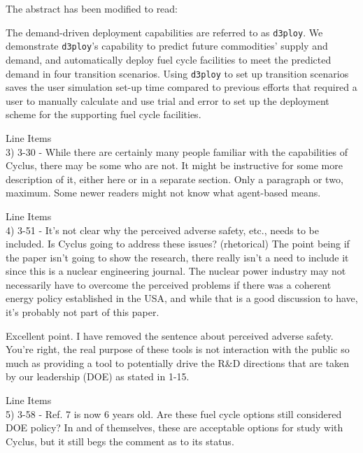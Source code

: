 \documentclass[answers,11pt]{exam}
\newcommand{\deploy}{\texttt{d3ploy}\xspace}%
\begin{document}
\begin{questions}
\begin{solution}
The abstract has been modified to read: 

The demand-driven deployment capabilities are referred to as \deploy. 
We demonstrate \deploy's capability to predict future commodities' 
supply and demand, and automatically deploy fuel 
cycle facilities to meet the predicted demand in four transition scenarios. 
Using \deploy to set up transition scenarios saves the user 
simulation set-up time compared to previous efforts that
required a user to manually calculate and use trial and error 
to set up the deployment scheme for the supporting fuel cycle 
facilities. 
\end{solution}

\question Line Items \\
3) 3-30 - While there are certainly many people familiar with the capabilities of Cyclus, there may be
some who are not. It might be instructive for some more description of it, either here or in a separate
section. Only a paragraph or two, maximum. Some newer readers might not know what agent-based
means.

\begin{solution}
\end{solution}

\question Line Items \\
4) 3-51 - It’s not clear why the perceived adverse safety, etc., needs to be included. Is Cyclus going
to address these issues? (rhetorical) The point being if the paper isn’t going to show the research,
there really isn’t a need to include it since this is a nuclear engineering journal. The nuclear power
industry may not necessarily have to overcome the perceived problems if there was a coherent energy
policy established in the USA, and while that is a good discussion to have, it’s probably not part of
this paper.

\begin{solution}
Excellent point. I have removed the sentence about perceived adverse safety. You're right, the real purpose 
of these tools is not interaction with the public so much as providing a tool to potentially drive the 
R\&D directions that are taken by our leadership (DOE) as stated in 1-15. 
\end{solution}

\question Line Items \\
5) 3-58 - Ref. 7 is now 6 years old. Are these fuel cycle options still considered DOE policy? In and of
themselves, these are acceptable options for study with Cyclus, but it still begs the comment as to its
status.


\end{questions}
\end{document}
